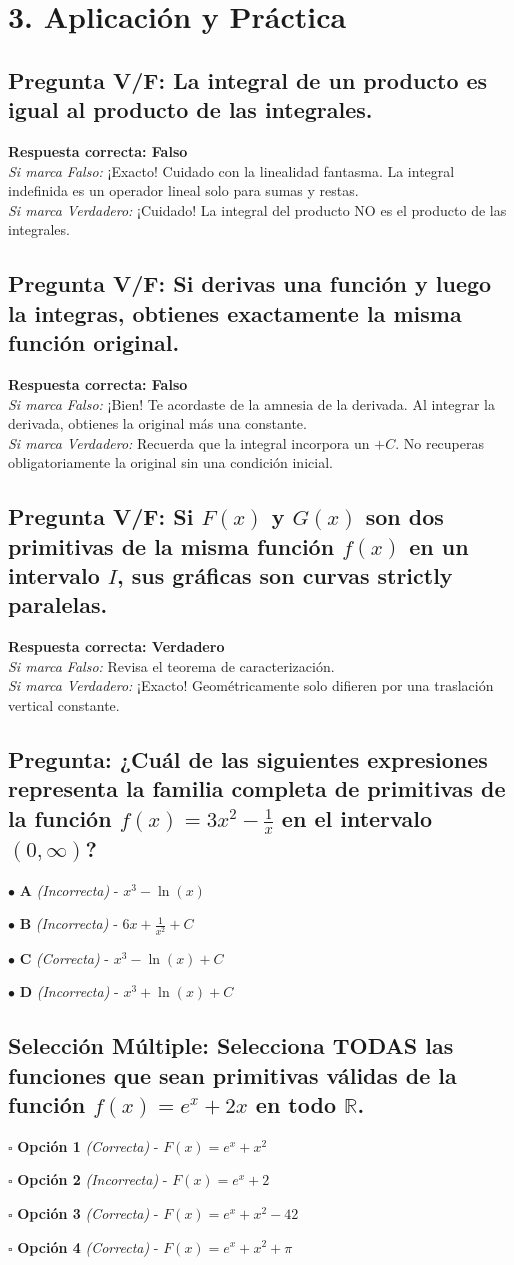 \documentclass[11pt]{article}
\newenvironment{aplicacion}{\section*{3. Aplicación y Práctica}}{}
\newenvironment{preguntaalternativas}[1]{\subsection*{Pregunta: #1}\par\vspace{0.1cm}}{\vspace{0.3cm}}
\newcommand{\opcion}[3]{\par\noindent $\bullet$ \textbf{#1} \textit{(#2)} - #3\par\vspace{0.15cm}}
\newenvironment{preguntaverdaderofalso}[1]{\subsection*{Pregunta V/F: #1}\par\vspace{0.1cm}}{\vspace{0.3cm}}
\newcommand{\verdaderofalso}[3]{\par\noindent\textbf{Respuesta correcta: #1} \\ \textit{Si marca Falso:} #2 \\ \textit{Si marca Verdadero:} #3\par\vspace{0.15cm}}
\newenvironment{preguntacasillas}[1]{\subsection*{Selección Múltiple: #1}\par\vspace{0.1cm}}{\vspace{0.3cm}}
\newcommand{\casilla}[3]{\par\noindent $\square$ \textbf{#1} \textit{(#2)} - #3\par\vspace{0.15cm}}
\begin{document}
\begin{aplicacion}

  \begin{preguntaverdaderofalso}{La integral de un producto es igual al producto de las integrales.}
    \verdaderofalso{Falso}
    {¡Exacto! Cuidado con la linealidad fantasma. La integral indefinida es un operador lineal solo para sumas y restas.}
    {¡Cuidado! La integral del producto NO es el producto de las integrales.}
  \end{preguntaverdaderofalso}

  \begin{preguntaverdaderofalso}{Si derivas una función y luego la integras, obtienes exactamente la misma función original.}
    \verdaderofalso{Falso}
    {¡Bien! Te acordaste de la amnesia de la derivada. Al integrar la derivada, obtienes la original más una constante.}
    {Recuerda que la integral incorpora un $+C$. No recuperas obligatoriamente la original sin una condición inicial.}
  \end{preguntaverdaderofalso}

  \begin{preguntaverdaderofalso}{Si $F(x)$ y $G(x)$ son dos primitivas de la misma función $f(x)$ en un intervalo $I$, sus gráficas son curvas strictly paralelas.}
    \verdaderofalso{Verdadero}
    {Revisa el teorema de caracterización.}
    {¡Exacto! Geométricamente solo difieren por una traslación vertical constante.}
  \end{preguntaverdaderofalso}

  \begin{preguntaalternativas}{¿Cuál de las siguientes expresiones representa la familia completa de primitivas de la función $f(x) = 3x^2 - \frac{1}{x}$ en el intervalo $(0, \infty)$?}
    \opcion{A}{Incorrecta}{$x^3 - \ln(x)$}
    \opcion{B}{Incorrecta}{$6x + \frac{1}{x^2} + C$}
    \opcion{C}{Correcta}{$x^3 - \ln(x) + C$}
    \opcion{D}{Incorrecta}{$x^3 + \ln(x) + C$}
  \end{preguntaalternativas}

  \begin{preguntacasillas}{Selecciona TODAS las funciones que sean primitivas válidas de la función $f(x) = e^x + 2x$ en todo $\mathbb{R}$.}
    \casilla{Opción 1}{Correcta}{$F(x) = e^x + x^2$}
    \casilla{Opción 2}{Incorrecta}{$F(x) = e^x + 2$}
    \casilla{Opción 3}{Correcta}{$F(x) = e^x + x^2 - 42$}
    \casilla{Opción 4}{Correcta}{$F(x) = e^x + x^2 + \pi$}
  \end{preguntacasillas}


\end{aplicacion}
\end{document}
